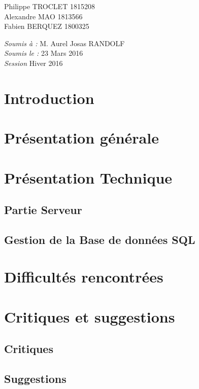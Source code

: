 \documentclass[12pt, a4paper]{article}%
\begin{document}
\begin{titlepage}
\begin{sffamily}
\begin{center}
    \begin{minipage}{0.4\textwidth}
      \begin{flushleft} \large
          Philippe TROCLET \textsc{1815208}\\
          Alexandre  MAO \textsc{1813566}\\
          Fabien  BERQUEZ \textsc{1800325}\\
      \end{flushleft}
    \end{minipage}
    \begin{minipage}{0.4\textwidth}
      \begin{flushright} \large
        \emph{Soumis à :} M. Aurel Josas RANDOLF\\
        \emph{Soumis le :} 23 Mars 2016  \\
        \emph{Session} Hiver 2016 
      \end{flushright}
    \end{minipage}

    \vfill

  \end{center}
  \end{sffamily}
\end{titlepage}%


\section{Introduction}


\section{Présentation générale}


\section{Présentation Technique}
    \subsection{Partie Serveur}
    
    \subsection{Gestion de la Base de données SQL}
    
\section{Difficultés rencontrées}
    
\section{Critiques et suggestions}
    \subsection{Critiques}
    
    \subsection{Suggestions}
    
\end{document}
